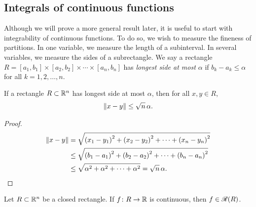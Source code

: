 \subsection{Integrals of continuous functions}

Although we will prove a more general result later, it is useful to start
with integrability of continuous functions.
To do so, we wish to measure the fineness of partitions.
In one variable, we measure the length of a subinterval.
In several variables, we measure the sides of a subrectangle.
We say a rectangle $R = [a_1,b_1] \times
[a_2,b_2] \times \cdots \times
[a_n,b_n]$ has \emph{longest side at most $\alpha$} if
$b_k-a_k \leq \alpha$ for all $k=1,2,\ldots,n$.

\begin{prop} \label{prop:diameterrectangle}
If a rectangle $R \subset {\mathbb{R}}^n$ has longest side at most $\alpha$, then
for all $x,y \in R$,
\begin{equation*}
\lVert {x-y} \rVert \leq \sqrt{n} \, \alpha .
\end{equation*}
\end{prop}

\begin{proof}
\begin{equation*}
\begin{split}
\lVert {x-y} \rVert 
& =
\sqrt{
{(x_1-y_1)}^2
+
{(x_2-y_2)}^2
+ \cdots +
{(x_n-y_n)}^2
}
\\
& \leq
\sqrt{
{(b_1-a_1)}^2
+
{(b_2-a_2)}^2
+ \cdots +
{(b_n-a_n)}^2
}
\\
& \leq
\sqrt{
{\alpha}^2
+
{\alpha}^2
+ \cdots +
{\alpha}^2
}
=
\sqrt{n} \, \alpha .  \qedhere
\end{split}
\end{equation*}
\end{proof}


\begin{thm} \label{mv:thm:contintrect}
Let $R \subset {\mathbb{R}}^n$ be a closed rectangle.
If $f \colon R \to {\mathbb{R}}$ is continuous, then $f \in {\mathscr{R}}(R)$.
\end{thm}

